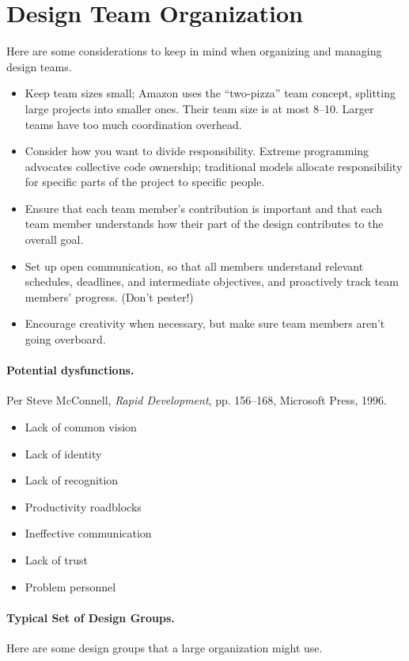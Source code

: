 \section*{Design Team Organization}
Here are some considerations to keep in mind when organizing and managing
design teams.

\begin{itemize}
\item Keep team sizes small; Amazon uses the ``two-pizza'' team concept,
splitting large projects into smaller ones. Their team size is at most
8--10. Larger teams have too much coordination overhead.
\item Consider how you want to divide responsibility. Extreme
  programming advocates collective code ownership; traditional models
  allocate responsibility for specific parts of the project to
  specific people.
\item Ensure that each team member's contribution is important and
  that each team member understands how their part of the design
  contributes to the overall goal.
\item Set up open communication, so that all members understand
  relevant schedules, deadlines, and intermediate objectives, and
  proactively track team members' progress. (Don't pester!)
\item Encourage creativity when necessary, but make sure team members
  aren't going overboard.
\end{itemize}

\paragraph{Potential dysfunctions.} Per Steve McConnell, \emph{Rapid Development}, 
pp. 156--168, Microsoft Press, 1996.
\begin{itemize}
\item Lack of common vision
\item Lack of identity
\item Lack of recognition
\item Productivity roadblocks
\item Ineffective communication
\item Lack of trust
\item Problem personnel
\end{itemize}

\paragraph{Typical Set of Design Groups.} Here are some design groups
that a large organization might use.

